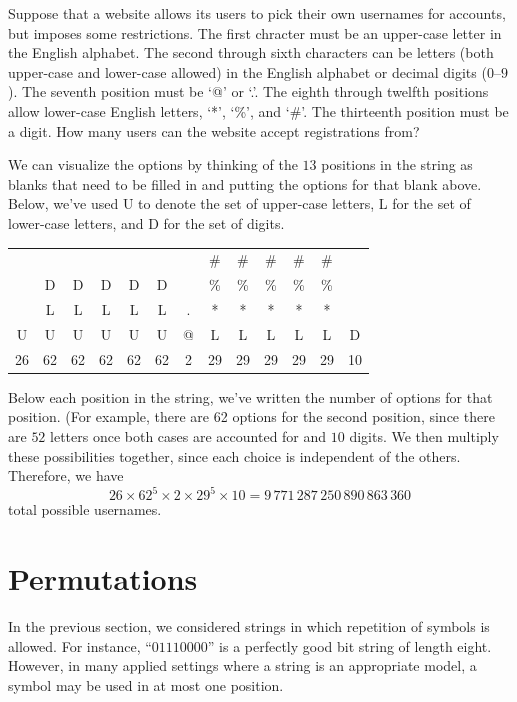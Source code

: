 \begin{example}
  Suppose that a website allows its users to pick their own usernames
  for accounts, but imposes some restrictions. The first chracter must
  be an upper-case letter in the English alphabet. The second through
  sixth characters can be letters (both upper-case and lower-case
  allowed) in the English alphabet or decimal digits ($0$--$9$). The
  seventh position must be `@' or `.'. The eighth through twelfth
  positions allow lower-case English letters, `*', `\%',
  and `\#'. The thirteenth position must be a digit. How many users
  can the website accept registrations from?
  \medskip

  \noindent We can visualize the options by thinking of the $13$
  positions in the string as blanks that need to be filled in and
  putting the options for that blank above. Below, we've used U to
  denote the set of upper-case letters, L for the set of lower-case
  letters, and D for the set of digits.
  \begin{center}
    \begin{tabular}{ccccccccccccc}
      &&&&&&&\#&\#&\#&\#&\#&\\
      &D&D&D&D&D&&\%&\%&\%&\%&\%&\\
      &L&L&L&L&L&.&*&*&*&*&*&\\
      U&U&U&U&U&U&@&L&L&L&L&L&D\\\hline
      26 & 62 & 62 & 62 & 62 & 62 & 2 & 29 & 29 & 29 & 29 & 29 & 10
    \end{tabular}
  \end{center}
\end{example}
\noindent Below each position in the string, we've written the number of options
for that position. (For example, there are 62 options for the second
position, since there are $52$ letters once both cases are accounted for and $10$
digits. We then multiply these possibilities together, since each
choice is independent of the others. Therefore, we have
\[26\times 62^5 \times 2 \times 29^5\times 10 =
9\,771\,287\,250\,890\,863\,360\]
total possible usernames.

\section{Permutations}\label{s:strings:permutations}

In the previous section, we considered strings in which repetition of
symbols is allowed. For instance, ``$01110000$'' is a perfectly good
bit string of length eight. However, in many applied settings where a
string is an appropriate model, a symbol may be used in at most one
position.

